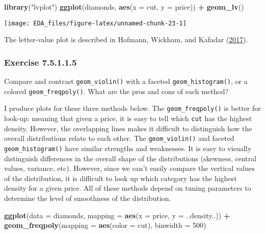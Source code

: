 \documentclass[]{book}
\newenvironment{Shaded}{\begin{snugshade}}{\end{snugshade}}
\newcommand{\DataTypeTok}[1]{\textcolor[rgb]{0.13,0.29,0.53}{#1}}
\newcommand{\DecValTok}[1]{\textcolor[rgb]{0.00,0.00,0.81}{#1}}
\newcommand{\KeywordTok}[1]{\textcolor[rgb]{0.13,0.29,0.53}{\textbf{#1}}}
\newcommand{\NormalTok}[1]{#1}
\newcommand{\OperatorTok}[1]{\textcolor[rgb]{0.81,0.36,0.00}{\textbf{#1}}}
\newcommand{\StringTok}[1]{\textcolor[rgb]{0.31,0.60,0.02}{#1}}
\theoremstyle{plain}
\theoremstyle{remark}
\begin{document}
\begin{Shaded}
\begin{Highlighting}[]
\KeywordTok{library}\NormalTok{(}\StringTok{"lvplot"}\NormalTok{)}
\KeywordTok{ggplot}\NormalTok{(diamonds, }\KeywordTok{aes}\NormalTok{(}\DataTypeTok{x =}\NormalTok{ cut, }\DataTypeTok{y =}\NormalTok{ price)) }\OperatorTok{+}
\StringTok{  }\KeywordTok{geom_lv}\NormalTok{()}
\end{Highlighting}
\end{Shaded}

\begin{center}\texttt{[image: EDA\_files/figure-latex/unnamed-chunk-23-1]} \end{center}

The letter-value plot is described in Hofmann, Wickham, and Kafadar
(\protect\hyperlink{ref-HofmannWickhamKafadar2017}{2017}).

\hypertarget{exercise-7.5.1.1.5}{%
\subsubsection*{\texorpdfstring{Exercise
{7.5.1.1.5}}{Exercise 7.5.1.1.5}}\label{exercise-7.5.1.1.5}}

Compare and contrast \texttt{geom\_violin()} with a faceted
\texttt{geom\_histogram()}, or a colored \texttt{geom\_freqpoly()}. What
are the pros and cons of each method?

I produce plots for these three methods below. The
\texttt{geom\_freqpoly()} is better for look-up: meaning that given a
price, it is easy to tell which \texttt{cut} has the highest density.
However, the overlapping lines makes it difficult to distinguish how the
overall distributions relate to each other. The \texttt{geom\_violin()}
and faceted \texttt{geom\_histogram()} have similar strengths and
weaknesses. It is easy to visually distinguish differences in the
overall shape of the distributions (skewness, central values, variance,
etc). However, since we can't easily compare the vertical values of the
distribution, it is difficult to look up which category has the highest
density for a given price. All of these methods depend on tuning
parameters to determine the level of smoothness of the distribution.

\begin{Shaded}
\begin{Highlighting}[]
\KeywordTok{ggplot}\NormalTok{(}\DataTypeTok{data =}\NormalTok{ diamonds, }\DataTypeTok{mapping =} \KeywordTok{aes}\NormalTok{(}\DataTypeTok{x =}\NormalTok{ price, }\DataTypeTok{y =}\NormalTok{ ..density..)) }\OperatorTok{+}
\StringTok{  }\KeywordTok{geom_freqpoly}\NormalTok{(}\DataTypeTok{mapping =} \KeywordTok{aes}\NormalTok{(}\DataTypeTok{color =}\NormalTok{ cut), }\DataTypeTok{binwidth =} \DecValTok{500}\NormalTok{)}
\end{Highlighting}
\end{Shaded}
\end{document}
